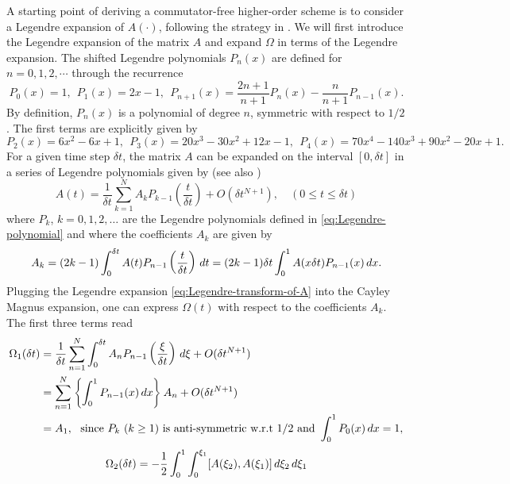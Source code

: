 \documentclass{article}
\newcommand{\diff}{\,{\rm d}}
\newcommand{\Om}{\Omega}
\begin{document}
{A starting point of deriving a commutator-free higher-order scheme is to consider a Legendre expansion of $A(\cdot)$, following the strategy in \cite{AF:2011}. We will first introduce the Legendre expansion of the matrix $A$ and expand $\Om$ in terms of the Legendre expansion. The shifted Legendre polynomials $P_n(x)$ are defined for $n=0,1,2,\cdots$ through the recurrence
%
\begin{equation}
\label{eq:Legendre-polynomial}
P_0(x) = 1, ~~ P_1(x) = 2x-1, ~~ P_{n+1}(x) = \frac{2n+1}{n+1} P_n(x) - \frac{n}{n+1} P_{n-1}(x). 
\end{equation}
%
By definition, $P_n(x)$ is a polynomial of degree $n$, symmetric with respect to $1/2$. The first terms are explicitly given by
%
\small{
\begin{equation*}
P_2(x) = 6x^2 - 6x + 1, ~~ P_3(x) = 20x^3 - 30x^2 + 12x - 1, ~~ P_4(x) = 70x^4 - 140x^3 + 90x^2 - 20x + 1.
\end{equation*}}
For a given time step $\delta t$, the matrix $A$ can be expanded on the interval $[0, \delta t]$ in a series of Legendre polynomials given by (see also \cite{AF:2011})
%
\begin{equation}
\label{eq:Legendre-transform-of-A}
A(t) = \frac{1}{\delta t} \sum_{k=1}^N A_k P_{k-1}\left(\frac{t}{\delta t}\right) + O(\delta t^{N+1}), \quad (0\leq t \leq \delta t)
\end{equation}
%
where $P_k$, $k=0,1,2,\ldots$ are the Legendre polynomials defined in \eqref{eq:Legendre-polynomial} and where the coefficients $A_k$ are given by
%
\[
A_k = (2k-1) \int_0^{\delta t} A(t) P_{n-1}\left(\frac{t}{\delta t} \right) \diff t = (2k-1)\delta t \int_0^1 A(x\delta t) P_{n-1}(x) \diff x.
\]
%
Plugging the Legendre expansion \eqref{eq:Legendre-transform-of-A} into the Cayley Magnus expansion, one can express $\Om(t)$ with respect to the coefficients $A_k$. The first three terms read %
%
\[
\begin{aligned}
\Om_1(\delta t) &= \frac{1}{\delta t} \sum_{n=1}^N \int_0^{\delta t} A_n P_{n-1}\left(\frac{\xi}{\delta t}\right) \diff \xi + O(\delta t ^{N+1}) \\
&= \sum_{n=1}^N \left\{\int_0^{1} P_{n-1}(x) \diff x \right\} A_n + O(\delta t ^{N+1}) \\
&= A_1, ~~ \text{since $P_k$ ($k\geq 1$) is anti-symmetric w.r.t $1/2$ and} ~ \int_0^{1} P_{0}(x) \diff x = 1, \\
\end{aligned}
\]
\[
\begin{aligned}
\Om_2(\delta t) &= -\frac{1}{2} \int_0^1 \int_0^{\xi_1} [A(\xi_2), A(\xi_1)] \diff \xi_2 \diff \xi_1 \\

\end{aligned}\]}
\end{document}
